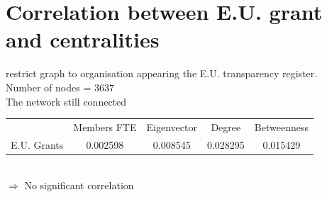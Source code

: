 \documentclass[ 11pt]{article}
\begin{document}
\section{Correlation between E.U. grant and centralities}
restrict graph to organisation appearing the E.U. transparency register. \\
Number of nodes = 3637 \\
The network still connected \\
\begin{tabular}{|ccccc|}
\hline
             &Members FTE  &Eigenvector   & Degree  &Betweenness\\
E.U. Grants  &0.002598    &0.008545  &0.028295     &0.015429\\
\hline
\end{tabular}  \\
$\Rightarrow$ No significant correlation
\end{document}
